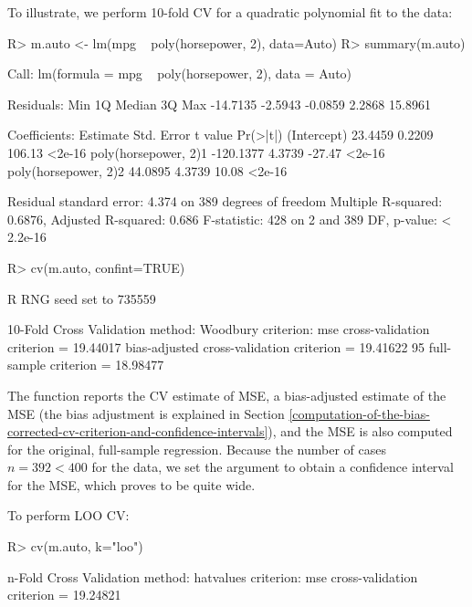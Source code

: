 \documentclass[
]{jss}
\begin{document}
To illustrate, we perform 10-fold CV for a quadratic polynomial fit to
the  data:

\begin{CodeChunk}
\begin{CodeInput}
R> m.auto <- lm(mpg ~ poly(horsepower, 2), data=Auto)
R> summary(m.auto)
\end{CodeInput}
\begin{CodeOutput}

Call:
lm(formula = mpg ~ poly(horsepower, 2), data = Auto)

Residuals:
     Min       1Q   Median       3Q      Max 
-14.7135  -2.5943  -0.0859   2.2868  15.8961 

Coefficients:
                      Estimate Std. Error t value Pr(>|t|)
(Intercept)            23.4459     0.2209  106.13   <2e-16
poly(horsepower, 2)1 -120.1377     4.3739  -27.47   <2e-16
poly(horsepower, 2)2   44.0895     4.3739   10.08   <2e-16

Residual standard error: 4.374 on 389 degrees of freedom
Multiple R-squared:  0.6876,    Adjusted R-squared:  0.686 
F-statistic:   428 on 2 and 389 DF,  p-value: < 2.2e-16
\end{CodeOutput}
\begin{CodeInput}
R> cv(m.auto, confint=TRUE)
\end{CodeInput}
\begin{CodeOutput}
R RNG seed set to 735559
\end{CodeOutput}
\begin{CodeOutput}
10-Fold Cross Validation
method: Woodbury
criterion: mse
cross-validation criterion = 19.44017
bias-adjusted cross-validation criterion = 19.41622
95%
full-sample criterion = 18.98477 
\end{CodeOutput}
\end{CodeChunk}

The function reports the CV estimate of MSE, a bias-adjusted estimate of
the MSE (the bias adjustment is explained in Section
\ref{computation-of-the-bias-corrected-cv-criterion-and-confidence-intervals}),
and the MSE is also computed for the original, full-sample regression.
Because the number of cases \(n = 392 < 400\) for the  data,
we set the argument  to obtain a confidence interval
for the MSE, which proves to be quite wide.

To perform LOO CV:

\begin{CodeChunk}
\begin{CodeInput}
R> cv(m.auto, k="loo")
\end{CodeInput}
\begin{CodeOutput}
n-Fold Cross Validation
method: hatvalues
criterion: mse
cross-validation criterion = 19.24821
\end{CodeOutput}
\end{CodeChunk}
\end{document}
